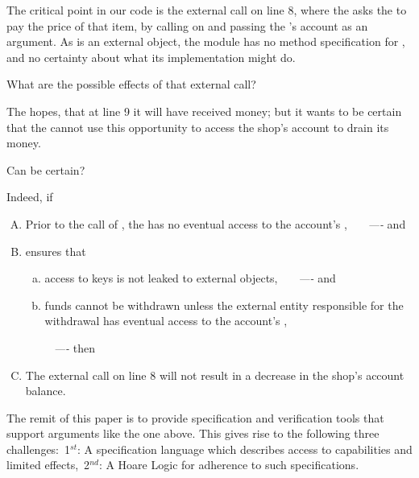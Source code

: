 \vspace{.1in}

The critical point in our code is the external call on line 8,   {where the  asks the  to pay the price of that item,
by calling   on  and passing the 's account as an argument.
As  is an external object, the module \Mshop has no method specification for , and no 
certainty about what its implementation %
might do. 
}

{What are the possible effects of that external call?}
{The  hopes, %
 that at line 9  it  will have received money; but 
it wants to be certain  that the  cannot use this opportunity to access the 
shop's account to drain its money.

Can   be certain?} Indeed, if

\vspace{.05cm}
\begin{enumerate}[(A)]
\item   Prior to the call of  , the   has no eventual access to the account's \password, \ \ \ \emph{----} and
\item  \Mshop ensures that 
\begin{enumerate}[(a)]
\item access to keys is not leaked to external objects, \ \ \ \emph{----} and
\item   funds cannot be withdrawn unless the external entity responsible for the withdrawal has eventual access to the account's \password,
\end{enumerate}
\ \  \ \ \ \emph{----} then
\item  The external  call on line 8 will not result  in a decrease in the shop's account balance.
\end{enumerate}



\noindent
The remit of this paper is to provide specification and verification tools that support arguments like the one above.
This gives rise to the following three challenges:\  1$^{st}$:  A specification language which describes access to capabilities and limited effects,\ 
2$^{nd}$: A  Hoare Logic for adherence to such specifications.

